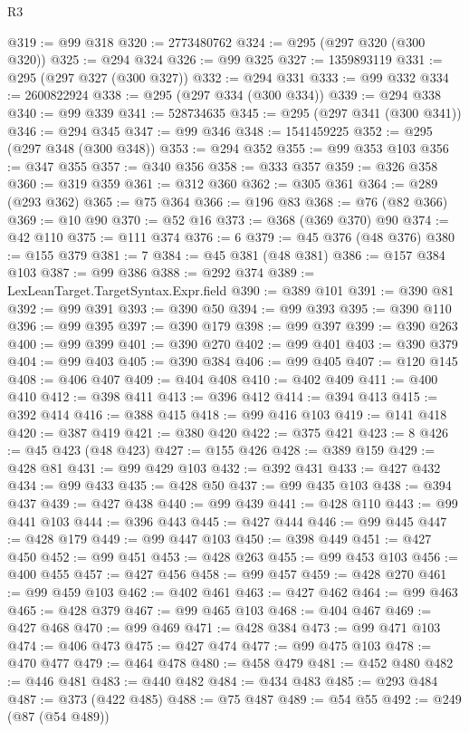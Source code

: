 \begin{lexlean}{R3}
\begin{coremodule}
@319 := @99 @318
@320 := 2773480762
@324 := @295 (@297 @320 (@300 @320))
@325 := @294 @324
@326 := @99 @325
@327 := 1359893119
@331 := @295 (@297 @327 (@300 @327))
@332 := @294 @331
@333 := @99 @332
@334 := 2600822924
@338 := @295 (@297 @334 (@300 @334))
@339 := @294 @338
@340 := @99 @339
@341 := 528734635
@345 := @295 (@297 @341 (@300 @341))
@346 := @294 @345
@347 := @99 @346
@348 := 1541459225
@352 := @295 (@297 @348 (@300 @348))
@353 := @294 @352
@355 := @99 @353 @103
@356 := @347 @355
@357 := @340 @356
@358 := @333 @357
@359 := @326 @358
@360 := @319 @359
@361 := @312 @360
@362 := @305 @361
@364 := @289 (@293 @362)
@365 := @75 @364
@366 := @196 @83
@368 := @76 (@82 @366)
@369 := @10 @90
@370 := @52 @16
@373 := @368 (@369 @370) @90
@374 := @42 @110
@375 := @111 @374
@376 := 6
@379 := @45 @376 (@48 @376)
@380 := @155 @379
@381 := 7
@384 := @45 @381 (@48 @381)
@386 := @157 @384 @103
@387 := @99 @386
@388 := @292 @374
@389 := LexLeanTarget.TargetSyntax.Expr.field
@390 := @389 @101
@391 := @390 @81
@392 := @99 @391
@393 := @390 @50
@394 := @99 @393
@395 := @390 @110
@396 := @99 @395
@397 := @390 @179
@398 := @99 @397
@399 := @390 @263
@400 := @99 @399
@401 := @390 @270
@402 := @99 @401
@403 := @390 @379
@404 := @99 @403
@405 := @390 @384
@406 := @99 @405
@407 := @120 @145
@408 := @406 @407
@409 := @404 @408
@410 := @402 @409
@411 := @400 @410
@412 := @398 @411
@413 := @396 @412
@414 := @394 @413
@415 := @392 @414
@416 := @388 @415
@418 := @99 @416 @103
@419 := @141 @418
@420 := @387 @419
@421 := @380 @420
@422 := @375 @421
@423 := 8
@426 := @45 @423 (@48 @423)
@427 := @155 @426
@428 := @389 @159
@429 := @428 @81
@431 := @99 @429 @103
@432 := @392 @431
@433 := @427 @432
@434 := @99 @433
@435 := @428 @50
@437 := @99 @435 @103
@438 := @394 @437
@439 := @427 @438
@440 := @99 @439
@441 := @428 @110
@443 := @99 @441 @103
@444 := @396 @443
@445 := @427 @444
@446 := @99 @445
@447 := @428 @179
@449 := @99 @447 @103
@450 := @398 @449
@451 := @427 @450
@452 := @99 @451
@453 := @428 @263
@455 := @99 @453 @103
@456 := @400 @455
@457 := @427 @456
@458 := @99 @457
@459 := @428 @270
@461 := @99 @459 @103
@462 := @402 @461
@463 := @427 @462
@464 := @99 @463
@465 := @428 @379
@467 := @99 @465 @103
@468 := @404 @467
@469 := @427 @468
@470 := @99 @469
@471 := @428 @384
@473 := @99 @471 @103
@474 := @406 @473
@475 := @427 @474
@477 := @99 @475 @103
@478 := @470 @477
@479 := @464 @478
@480 := @458 @479
@481 := @452 @480
@482 := @446 @481
@483 := @440 @482
@484 := @434 @483
@485 := @293 @484
@487 := @373 (@422 @485)
@488 := @75 @487
@489 := @54 @55
@492 := @249 (@87 (@54 @489))

\end{coremodule}
\end{lexlean}
